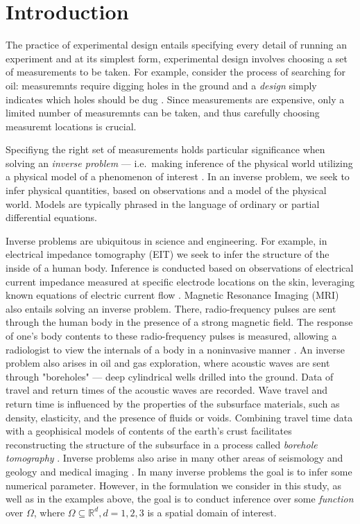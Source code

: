 \section{Introduction}\label{section:intro}
The practice of experimental design entails specifying every detail of
running an experiment \cite{chaloner1995} and at its simplest form,
experimental design involves choosing a set of measurements to be
taken. For example, consider the process of searching for oil:
measuremnts require digging holes in the ground and a \emph{design}
simply indicates which holes should be dug
\cite{horesh2008borehole}. Since measurements are expensive, only a
limited number of measuremnts can be taken, and thus carefully
choosing measuremt locations is crucial.

Specifiyng the right set of measurements holds particular significance
when solving an \emph{inverse problem} --- i.e.~making inference of
the physical world utilizing a physical model of a phenomenon of
interest \cite{tarantola2005,kaipio2005}. In an inverse problem, we
seek to infer physical quantities, based on observations and a model
of the physical world. Models are typically phrased in the language of
ordinary or partial differential equations.

Inverse problems are ubiquitous in science and engineering. For
example, in electrical impedance tomography (EIT) we seek to infer the
structure of the inside of a human body. Inference is conducted based
on observations of electrical current impedance measured at specific
electrode locations on the skin, leveraging known equations of
electric current flow \cite{horesh2010impedance}. Magnetic Resonance
Imaging (MRI) also entails solving an inverse problem. There,
radio-frequency pulses are sent through the human body in the presence
of a strong magnetic field. The response of one's body contents to
these radio-frequency pulses is measured, allowing a radiologist to
view the internals of a body in a noninvasive manner
\cite{horesh2008mri}. An inverse problem also arises in oil and gas
exploration, where acoustic waves are sent through "boreholes" ---
deep cylindrical wells drilled into the ground. Data of travel and
return times of the acoustic waves are recorded. Wave travel and
return time is influenced by the properties of the subsurface
materials, such as density, elasticity, and the presence of fluids or
voids. Combining travel time data with a geophisical models of
contents of the earth's crust facilitates reconstructing the structure
of the subsurface in a process called \emph{borehole tomography}
\cite{horesh2008borehole}. Inverse problems also arise in many other
areas of seismology and geology \cite{rabinowitz1990, steinberg1995}
and medical imaging \cite{tarantola2005}. In many inverse problems the
goal is to infer some numerical parameter. However, in the formulation
we consider in this study, as well as in the examples above, the goal
is to conduct inference over some \emph{function} over $\Omega$, where
\(\Omega \subseteq \mathbb{R}^d, d=1,2,3\) is a spatial domain of
interest.

